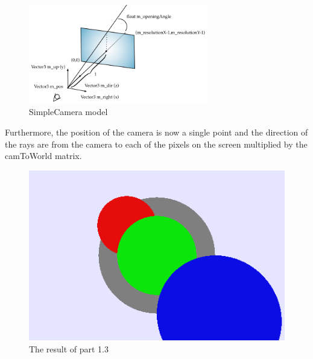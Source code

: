 \documentclass[10pt,a4paper]{report}
\begin{document}
\begin{figure}[h!]
\caption{SimpleCamera model}
  \centering
    \includegraphics[width=0.7\textwidth]{pixelLength.png}
\end{figure}
 Furthermore, the position of the camera is now a single point and the direction of the rays are from the camera to each of the pixels on the screen multiplied by the camToWorld matrix.
\begin{figure}[h!]
\caption{The result of part 1.3}
  \centering
    \includegraphics[width=1\textwidth]{framework/Image1_3.png}
\end{figure}
\newpage
\end{document}
